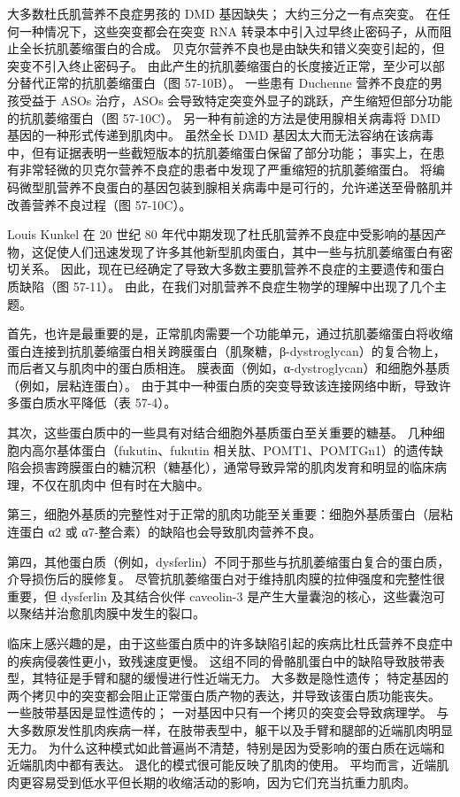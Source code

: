 大多数杜氏肌营养不良症男孩的 DMD 基因缺失； 大约三分之一有点突变。 在任何一种情况下，这些突变都会在突变 RNA 转录本中引入过早终止密码子，从而阻止全长抗肌萎缩蛋白的合成。 贝克尔营养不良也是由缺失和错义突变引起的，但突变不引入终止密码子。 由此产生的抗肌萎缩蛋白的长度接近正常，至少可以部分替代正常的抗肌萎缩蛋白（图 57-10B）。 一些患有 Duchenne 营养不良症的男孩受益于 ASOs 治疗，ASOs 会导致特定突变外显子的跳跃，产生缩短但部分功能的抗肌萎缩蛋白（图 57-10C）。 另一种有前途的方法是使用腺相关病毒将 DMD 基因的一种形式传递到肌肉中。 虽然全长 DMD 基因太大而无法容纳在该病毒中，但有证据表明一些截短版本的抗肌萎缩蛋白保留了部分功能； 事实上，在患有非常轻微的贝克尔营养不良症的患者中发现了严重缩短的抗肌萎缩蛋白。 将编码微型肌营养不良蛋白的基因包装到腺相关病毒中是可行的，允许递送至骨骼肌并改善营养不良过程（图 57-10C）。

Louis Kunkel 在 20 世纪 80 年代中期发现了杜氏肌营养不良症中受影响的基因产物，这促使人们迅速发现了许多其他新型肌肉蛋白，其中一些与抗肌萎缩蛋白有密切关系。 因此，现在已经确定了导致大多数主要肌营养不良症的主要遗传和蛋白质缺陷（图 57-11）。 由此，在我们对肌营养不良症生物学的理解中出现了几个主题。

首先，也许是最重要的是，正常肌肉需要一个功能单元，通过抗肌萎缩蛋白将收缩蛋白连接到抗肌萎缩蛋白相关跨膜蛋白（肌聚糖，β-dystroglycan）的复合物上，而后者又与肌肉中的蛋白质相连。 膜表面（例如，α-dystroglycan）和细胞外基质（例如，层粘连蛋白）。 由于其中一种蛋白质的突变导致该连接网络中断，导致许多蛋白质水平降低（表 57-4）。

其次，这些蛋白质中的一些具有对结合细胞外基质蛋白至关重要的糖基。 几种细胞内高尔基体蛋白（fukutin、fukutin 相关肽、POMT1、POMTGn1）的遗传缺陷会损害跨膜蛋白的糖沉积（糖基化），通常导致异常的肌肉发育和明显的临床病理，不仅在肌肉中 但有时在大脑中。

第三，细胞外基质的完整性对于正常的肌肉功能至关重要：细胞外基质蛋白（层粘连蛋白 α2 或 α7-整合素）的缺陷也会导致肌肉营养不良。

第四，其他蛋白质（例如，dysferlin）不同于那些与抗肌萎缩蛋白复合的蛋白质，介导损伤后的膜修复。 尽管抗肌萎缩蛋白对于维持肌肉膜的拉伸强度和完整性很重要，但 dysferlin 及其结合伙伴 caveolin-3 是产生大量囊泡的核心，这些囊泡可以聚结并治愈肌肉膜中发生的裂口。

临床上感兴趣的是，由于这些蛋白质中的许多缺陷引起的疾病比杜氏营养不良症中的疾病侵袭性更小，致残速度更慢。 这组不同的骨骼肌蛋白中的缺陷导致肢带表型，其特征是手臂和腿的缓慢进行性近端无力。 大多数是隐性遗传； 特定基因的两个拷贝中的突变都会阻止正常蛋白质产物的表达，并导致该蛋白质功能丧失。 一些肢带基因是显性遗传的； 一对基因中只有一个拷贝的突变会导致病理学。 与大多数原发性肌肉疾病一样，在肢带表型中，躯干以及手臂和腿部的近端肌肉明显无力。 为什么这种模式如此普遍尚不清楚，特别是因为受影响的蛋白质在远端和近端肌肉中都有表达。 退化的模式很可能反映了肌肉的使用。 平均而言，近端肌肉更容易受到低水平但长期的收缩活动的影响，因为它们充当抗重力肌肉。

